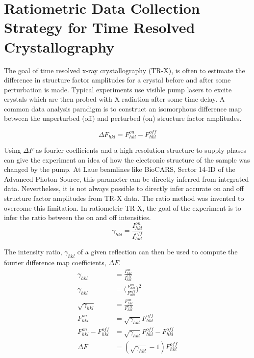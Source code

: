 \documentclass{report}
\begin{document}
\section{Ratiometric Data Collection Strategy for Time Resolved Crystallography}
The goal of time resolved x-ray crystallography (TR-X), is often to estimate the difference in structure factor amplitudes for a crystal before and after some perturbation is made. 
Typical experiments use visible pump lasers to excite crystals which are then probed with X radiation after some time delay. 
A common data analysis paradigm is to construct an isomorphous difference map between the unperturbed (off) and perturbed (on) structure factor amplitudes. 

\begin{equation}
\Delta F_{hkl} = F^{on}_{hkl} - F^{off}_{hkl}
\end{equation}

Using $\Delta F$ as fourier coefficients and a high resolution structure to supply phases can give the experiment an idea of how the electronic structure of the sample was changed by the pump. 
At Laue beamlines like BioCARS, Sector 14-ID of the Advanced Photon Source, this parameter can be directly inferred from integrated data. 
Nevertheless, it is not always possible to directly infer accurate on and off structure factor amplitudes from TR-X data. 
The ratio method was invented to overcome this limitation. 
In ratiometric TR-X, the goal of the experiment is to infer the ratio between the on and off intensities. 
\begin{equation} \label{eq:gamma}
\gamma_{hkl} = \frac{I^{on}_{hkl}}{I^{off}_{hkl}}
\end{equation}

The intensity ratio, $\gamma_{hkl}$ of a given reflection can then be used to compute the fourier difference map coefficients, $\Delta F$. 
\begin{align}
\gamma_{hkl} &= \frac{I^{on}_{hkl}}{I^{off}_{hkl}} \nonumber \\
\gamma_{hkl} &= \bigg( \frac{F^{on}_{hkl}}{F^{off}_{hkl}} \bigg) ^2 \nonumber \\
\sqrt{\gamma_{hkl}} &= \frac{F^{on}_{hkl}}{F^{off}_{hkl}} \nonumber \\
F^{on}_{hkl} &= \sqrt{\gamma_{hkl}} F^{off}_{hkl}  \nonumber \\
F^{on}_{hkl} - F^{off}_{hkl} &= \sqrt{\gamma_{hkl}} F^{off}_{hkl} - F^{off}_{hkl} \nonumber \\
\Delta F &= (\sqrt{\gamma_{hkl}} - 1 ) F^{off}_{hkl} 
\end{align}
\end{document}
